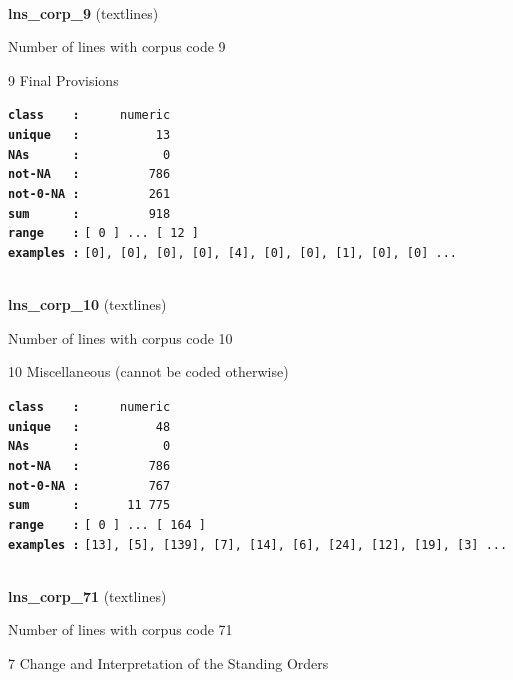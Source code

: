 \documentclass[]{article}
\begin{document}
~

\textbf{lns\_corp\_9} (textlines)

Number of lines with corpus code 9

9 Final Provisions

\textbf{\texttt{class\ \ \ \ :}} \texttt{~~~~~numeric}\\
\textbf{\texttt{unique\ \ \ :}} \texttt{~~~~~~~~~~13}\\
\textbf{\texttt{NAs\ \ \ \ \ \ :}} \texttt{~~~~~~~~~~~0}\\
\textbf{\texttt{not-NA\ \ \ :}} \texttt{~~~~~~~~~786}\\
\textbf{\texttt{not-0-NA\ :}} \texttt{~~~~~~~~~261}\\
\textbf{\texttt{sum\ \ \ \ \ \ :}} \texttt{~~~~~~~~~918}\\
\textbf{\texttt{range\ \ \ \ :}}
\texttt{{[}\ 0\ {]}\ ...\ {[}\ 12\ {]}}\\
\textbf{\texttt{examples\ :}}
\texttt{{[}0{]},\ {[}0{]},\ {[}0{]},\ {[}0{]},\ {[}4{]},\ {[}0{]},\ {[}0{]},\ {[}1{]},\ {[}0{]},\ {[}0{]}\ ...}\\

~

\textbf{lns\_corp\_10} (textlines)

Number of lines with corpus code 10

10 Miscellaneous (cannot be coded otherwise)

\textbf{\texttt{class\ \ \ \ :}} \texttt{~~~~~numeric}\\
\textbf{\texttt{unique\ \ \ :}} \texttt{~~~~~~~~~~48}\\
\textbf{\texttt{NAs\ \ \ \ \ \ :}} \texttt{~~~~~~~~~~~0}\\
\textbf{\texttt{not-NA\ \ \ :}} \texttt{~~~~~~~~~786}\\
\textbf{\texttt{not-0-NA\ :}} \texttt{~~~~~~~~~767}\\
\textbf{\texttt{sum\ \ \ \ \ \ :}} \texttt{~~~~~~11~775}\\
\textbf{\texttt{range\ \ \ \ :}}
\texttt{{[}\ 0\ {]}\ ...\ {[}\ 164\ {]}}\\
\textbf{\texttt{examples\ :}}
\texttt{{[}13{]},\ {[}5{]},\ {[}139{]},\ {[}7{]},\ {[}14{]},\ {[}6{]},\ {[}24{]},\ {[}12{]},\ {[}19{]},\ {[}3{]}\ ...}\\

~

\textbf{lns\_corp\_71} (textlines)

Number of lines with corpus code 71

7 Change and Interpretation of the Standing Orders
\end{document}

